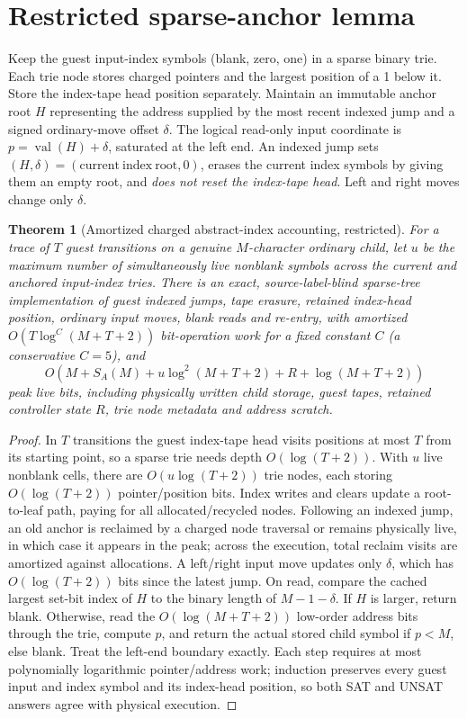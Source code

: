 \documentclass[11pt]{article}
\newtheorem{theorem}{Theorem}
\begin{document}
\section*{Restricted sparse-anchor lemma}
Keep the guest input-index symbols (blank, zero, one) in a sparse binary trie. Each trie node stores charged pointers and the largest position of a 1 below it. Store the index-tape head position separately. Maintain an immutable anchor root $H$ representing the address supplied by the most recent indexed jump and a signed ordinary-move offset $\delta$. The logical read-only input coordinate is $p=\operatorname{val}(H)+\delta$, saturated at the left end. An indexed jump sets $(H,\delta)=(\mathrm{current\ index\ root},0)$, erases the current index symbols by giving them an empty root, and \emph{does not reset the index-tape head}. Left and right moves change only $\delta$.
\begin{theorem}[Amortized charged abstract-index accounting, restricted]
For a trace of $T$ guest transitions on a genuine $M$-character ordinary child, let $u$ be the maximum number of simultaneously live nonblank symbols across the current and anchored input-index tries. There is an exact, source-label-blind sparse-tree implementation of guest indexed jumps, tape erasure, retained index-head position, ordinary input moves, blank reads and re-entry, with amortized $O(T\log^C(M+T+2))$ bit-operation work for a fixed constant $C$ (a conservative $C=5$), and
\[
O\!\left(M+S_A(M)+u\log^2(M+T+2)+R+\log(M+T+2)\right)
\]
peak live bits, including physically written child storage, guest tapes, retained controller state $R$, trie node metadata and address scratch.
\end{theorem}
\begin{proof}
In $T$ transitions the guest index-tape head visits positions at most $T$ from its starting point, so a sparse trie needs depth $O(\log(T+2))$. With $u$ live nonblank cells, there are $O(u\log(T+2))$ trie nodes, each storing $O(\log(T+2))$ pointer/position bits. Index writes and clears update a root-to-leaf path, paying for all allocated/recycled nodes. Following an indexed jump, an old anchor is reclaimed by a charged node traversal or remains physically live, in which case it appears in the peak; across the execution, total reclaim visits are amortized against allocations. A left/right input move updates only $\delta$, which has $O(\log(T+2))$ bits since the latest jump. On read, compare the cached largest set-bit index of $H$ to the binary length of $M-1-\delta$. If $H$ is larger, return blank. Otherwise, read the $O(\log(M+T+2))$ low-order address bits through the trie, compute $p$, and return the actual stored child symbol if $p<M$, else blank. Treat the left-end boundary exactly. Each step requires at most polynomially logarithmic pointer/address work; induction preserves every guest input and index symbol and its index-head position, so both SAT and UNSAT answers agree with physical execution.
\end{proof}
\end{document}
